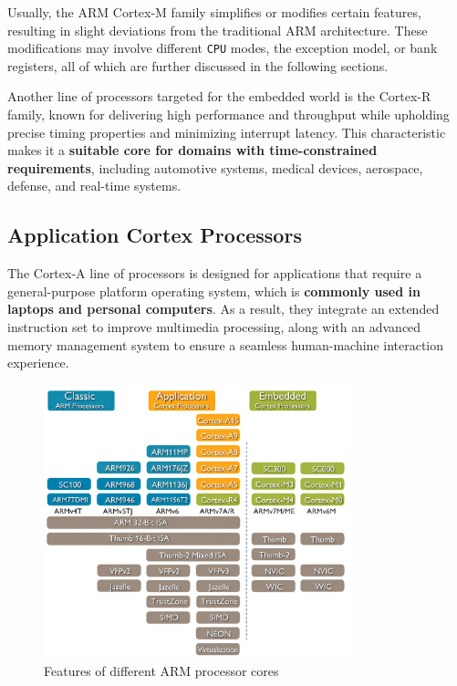 \documentclass[english, ing, kiv, he, iso690numb, pdf]{fasthesis}
\begin{document}
	\begin{important}
		Usually, the ARM Cortex-M family simplifies or modifies certain features, resulting in slight deviations from the traditional ARM architecture. These modifications may involve different \texttt{CPU} modes, the exception model, or bank registers, all of which are further discussed in the following sections.
	\end{important}
	
	Another line of processors targeted for the embedded world is the Cortex-R family, known for delivering high performance and throughput while upholding precise timing properties and minimizing interrupt latency. This characteristic makes it a \textbf{suitable core for domains with time-constrained requirements}, including automotive systems, medical devices, aerospace, defense, and real-time systems.
	
	\subsection{Application Cortex Processors}
	
	The Cortex-A line of processors is designed for applications that require a general-purpose platform operating system, which is \textbf{commonly used in laptops and personal computers}. As a result, they integrate an extended instruction set to improve multimedia processing, along with an advanced memory management system to ensure a seamless human-machine interaction experience.
	
	\begin{figure}[ht]
		\centering
		\includegraphics[width=0.8\textwidth]{img/diagrams/arm_processor_roadmap2.jpeg}
		\caption{Features of different ARM processor cores}
		\label{Features of different ARM processor cores}
	\end{figure}
	
\end{document}
